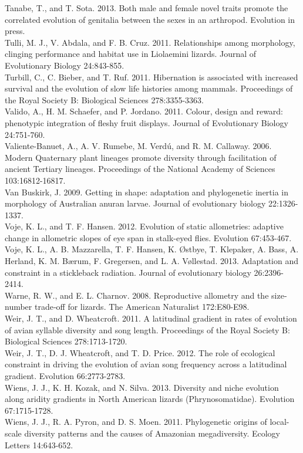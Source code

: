 Tanabe, T., and T. Sota. 2013. Both male and female novel traits promote the correlated evolution of genitalia between the sexes in an arthropod. Evolution in press.\\
Tulli, M. J., V. Abdala, and F. B. Cruz. 2011. Relationships among morphology, clinging performance and habitat use in Liolaemini lizards. Journal of Evolutionary Biology 24:843-855.\\
Turbill, C., C. Bieber, and T. Ruf. 2011. Hibernation is associated with increased survival and the evolution of slow life histories among mammals. Proceedings of the Royal Society B: Biological Sciences 278:3355-3363.\\
Valido, A., H. M. Schaefer, and P. Jordano. 2011. Colour, design and reward: phenotypic integration of fleshy fruit displays. Journal of Evolutionary Biology 24:751-760.\\
Valiente-Banuet, A., A. V. Rumebe, M. Verdú, and R. M. Callaway. 2006. Modern Quaternary plant lineages promote diversity through facilitation of ancient Tertiary lineages. Proceedings of the National Academy of Sciences 103:16812-16817.\\
Van Buskirk, J. 2009. Getting in shape: adaptation and phylogenetic inertia in morphology of Australian anuran larvae. Journal of evolutionary biology 22:1326-1337.\\
Voje, K. L., and T. F. Hansen. 2012. Evolution of static allometries: adaptive change in allometric slopes of eye span in stalk-eyed flies. Evolution 67:453-467.\\
Voje, K. L., A. B. Mazzarella, T. F. Hansen, K. Østbye, T. Klepaker, A. Bass, A. Herland, K. M. Bærum, F. Gregersen, and L. A. Vøllestad. 2013. Adaptation and constraint in a stickleback radiation. Journal of evolutionary biology 26:2396-2414.\\
Warne, R. W., and E. L. Charnov. 2008. Reproductive allometry and the size‐number trade‐off for lizards. The American Naturalist 172:E80-E98.\\
Weir, J. T., and D. Wheatcroft. 2011. A latitudinal gradient in rates of evolution of avian syllable diversity and song length. Proceedings of the Royal Society B: Biological Sciences 278:1713-1720.\\
Weir, J. T., D. J. Wheatcroft, and T. D. Price. 2012. The role of ecological constraint in driving the evolution of avian song frequency across a latitudinal gradient. Evolution 66:2773-2783.\\
Wiens, J. J., K. H. Kozak, and N. Silva. 2013. Diversity and niche evolution along aridity gradients in North American lizards (Phrynosomatidae). Evolution 67:1715-1728.\\
Wiens, J. J., R. A. Pyron, and D. S. Moen. 2011. Phylogenetic origins of local-scale diversity patterns and the causes of Amazonian megadiversity. Ecology Letters 14:643-652.
 
